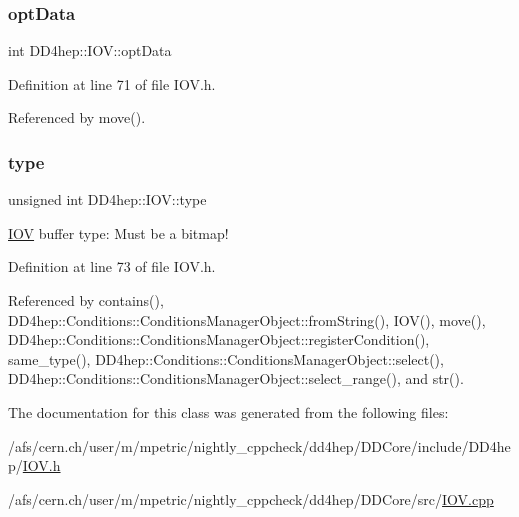 \hypertarget{class_d_d4hep_1_1_i_o_v_a0bd227cbdf7eab4949e12bffc7238d72}{}\label{class_d_d4hep_1_1_i_o_v_a0bd227cbdf7eab4949e12bffc7238d72} 
\subsubsection{\texorpdfstring{opt\+Data}{optData}}
{\footnotesize\ttfamily int D\+D4hep\+::\+I\+O\+V\+::opt\+Data}



Definition at line 71 of file I\+O\+V.\+h.



Referenced by move().

\hypertarget{class_d_d4hep_1_1_i_o_v_a497f2859ca7cb011151ae6b977b50aa0}{}\label{class_d_d4hep_1_1_i_o_v_a497f2859ca7cb011151ae6b977b50aa0} 
\subsubsection{\texorpdfstring{type}{type}}
{\footnotesize\ttfamily unsigned int D\+D4hep\+::\+I\+O\+V\+::type}



\hyperlink{class_d_d4hep_1_1_i_o_v}{I\+OV} buffer type\+: Must be a bitmap! 



Definition at line 73 of file I\+O\+V.\+h.



Referenced by contains(), D\+D4hep\+::\+Conditions\+::\+Conditions\+Manager\+Object\+::from\+String(), I\+O\+V(), move(), D\+D4hep\+::\+Conditions\+::\+Conditions\+Manager\+Object\+::register\+Condition(), same\+\_\+type(), D\+D4hep\+::\+Conditions\+::\+Conditions\+Manager\+Object\+::select(), D\+D4hep\+::\+Conditions\+::\+Conditions\+Manager\+Object\+::select\+\_\+range(), and str().



The documentation for this class was generated from the following files\+:\begin{DoxyCompactItemize}
\item 
/afs/cern.\+ch/user/m/mpetric/nightly\+\_\+cppcheck/dd4hep/\+D\+D\+Core/include/\+D\+D4hep/\hyperlink{_i_o_v_8h}{I\+O\+V.\+h}\item 
/afs/cern.\+ch/user/m/mpetric/nightly\+\_\+cppcheck/dd4hep/\+D\+D\+Core/src/\hyperlink{_i_o_v_8cpp}{I\+O\+V.\+cpp}\end{DoxyCompactItemize}
